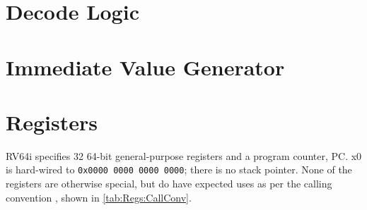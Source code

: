 \documentclass[a4paper, 11pt]{article}
\begin{document}
    \section{Decode Logic}\label{sec:Decode}

    \section{Immediate Value Generator}\label{sec:ImVal}

    \section{Registers}\label{sec:Regs}

        RV64i specifies 32 64-bit general-purpose registers and a program
        counter, PC. x0 is hard-wired to \verb|0x0000 0000 0000 0000|; there is 
        no stack pointer.
        None of the registers are otherwise special, but do have expected uses 
        as per the calling convention \cite{RV-CallConv}, shown in 
        \cref{tab:Regs:CallConv}.
\end{document}
